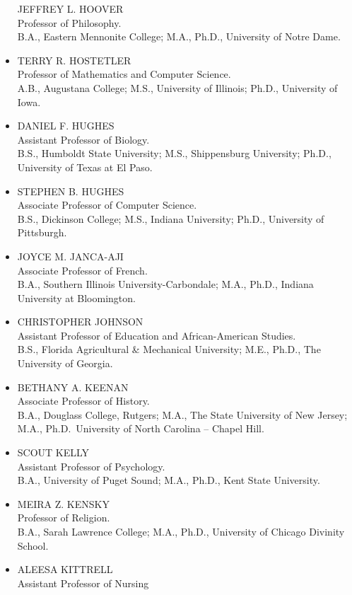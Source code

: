 \documentclass[
  letterpaper,
]{scrbook}
\begin{document}
\begin{itemize}
  JEFFREY L. HOOVER\\
  Professor of Philosophy.\\
  B.A., Eastern Mennonite College; M.A., Ph.D., University of Notre
  Dame.
\item
  TERRY R. HOSTETLER\\
  Professor of Mathematics and Computer Science.\\
  A.B., Augustana College; M.S., University of Illinois; Ph.D.,
  University of Iowa.
\item
  DANIEL F. HUGHES\\
  Assistant Professor of Biology.\\
  B.S., Humboldt State University; M.S., Shippensburg University; Ph.D.,
  University of Texas at El Paso.
\item
  STEPHEN B. HUGHES\\
  Associate Professor of Computer Science.\\
  B.S., Dickinson College; M.S., Indiana University; Ph.D., University
  of Pittsburgh.
\item
  JOYCE M. JANCA-AJI\\
  Associate Professor of French.\\
  B.A., Southern Illinois University-Carbondale; M.A., Ph.D., Indiana
  University at Bloomington.
\item
  CHRISTOPHER JOHNSON\\
  Assistant Professor of Education and African-American Studies.\\
  B.S., Florida Agricultural \& Mechanical University; M.E., Ph.D., The
  University of Georgia.
\item
  BETHANY A. KEENAN\\
  Associate Professor of History.\\
  B.A., Douglass College, Rutgers; M.A., The State University of New
  Jersey; M.A., Ph.D.~University of North Carolina -- Chapel Hill.
\item
  SCOUT KELLY\\
  Assistant Professor of Psychology.\\
  B.A., University of Puget Sound; M.A., Ph.D., Kent State University.
\item
  MEIRA Z. KENSKY\\
  Professor of Religion.\\
  B.A., Sarah Lawrence College; M.A., Ph.D., University of Chicago
  Divinity School.
\item
  ALEESA KITTRELL\\
  Assistant Professor of Nursing\\

\end{itemize}
\end{document}
